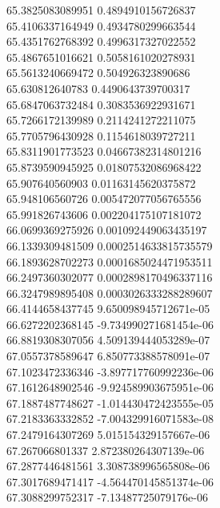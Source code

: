 {65.3825083089951 0.4894910156726837
 \\
65.4106337164949 0.4934780299663544
 \\
65.4351762768392 0.4996317327022552
 \\
65.4867651016621 0.5058161020278931
 \\
65.5613240669472 0.504926323890686
 \\
65.630812640783 0.4490643739700317
 \\
65.6847063732484 0.3083536922931671
 \\
65.7266172139989 0.2114241272211075
 \\
65.7705796430928 0.1154618039727211
 \\
65.8311901773523 0.04667382314801216
 \\
65.8739590945925 0.01807532086968422
 \\
65.907640560903 0.01163145620375872
 \\
65.948106560726 0.005472077056765556
 \\
65.991826743606 0.002204175107181072
 \\
66.0699369275926 0.001092449063435197
 \\
66.1339309481509 0.0002514633815735579
 \\
66.1893628702273 0.0001685024471953511
 \\
66.2497360302077 0.0002898170496337116
 \\
66.3247989895408 0.0003026333288289607
 \\
66.4144658437745 9.650098945712671e-05
 \\
66.6272202368145 -9.734990271681454e-06
 \\
66.8819308307056 4.509139444053289e-07
 \\
67.0557378589647 6.850773388578091e-07
 \\
67.1023472336346 -3.897717760992236e-06
 \\
67.1612648902546 -9.924589903675951e-06
 \\
67.1887487748627 -1.014430472423555e-05
 \\
67.2183363332852 -7.004329916071583e-08
 \\
67.2479164307269 5.015154329157667e-06
 \\
67.267066801337 2.872380264307139e-06
 \\
67.2877446481561 3.308738996565808e-06
 \\
67.3017689471417 -4.564470145851374e-06
 \\
67.3088299752317 -7.13487725079176e-06
 \\
}
